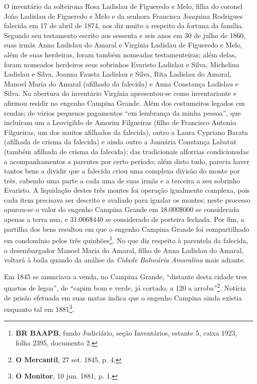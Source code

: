 O inventário da solteirona Rosa Ladislau de Figueredo e Melo, filha do coronel João Ladislau de Figueredo e Melo e da senhora Francisca Joaquina Rodrigues falecida em 17 de abril de 1874, nos diz muito a respeito da fortuna da família. Segundo seu testamento escrito aos sessenta e seis anos em 30 de julho de 1860, suas irmãs Anna Ladislau do Amaral e Virgínia Ladislau de Figueredo e Melo, além de suas herdeiras, foram também nomeadas testamenteiras; além delas, foram nomeados herdeiros seus sobrinhos Evaristo Ladislau e Silva, Michelina Ladislau e Silva, Joanna Fausta Ladislau e Silva, Rita Ladislau do Amaral, Manoel Maria do Amaral (afilhado da falecida) e Anna Constança Ladislau e Silva. Na abertura do inventário Virgínia apresentou-se como inventariante e afirmou residir no engenho Campina Grande. Além dos costumeiros legados em rendas; de vários pequenos pagamentos ``em lembrança da minha pessoa'', que incluíram um a Leovigildo de Amorim Filgueiras (filho de Francisco Antonio Filgueiras, um dos muitos afilhados da falecida), outro a Laura Cypriano Barata (afilhada de crisma da falecida) e ainda outro a Januária Constança Labatut (também afilhada de crisma da falecida); das tradicionais alforrias condicionadas a acompanhamentos a parentes por certo período; além disto tudo, parecia haver tantos bens a dividir que a falecida criou uma complexa divisão do monte por três, cabendo uma parte a cada uma de suas irmãs e a terceira a seu sobrinho Evaristo. A liquidação destes três montes foi operação igualmente complexa, pois cada item precisava ser descrito e avaliado para igualar os montes; neste processo apurou-se o valor do engenho Campina Grande em 18:000\$000 se considerada apenas a terra nua, e 31:006\$440 se considerado de porteira fechada. Por fim, a partilha dos bens resultou em que o engenho Campina Grande foi compartilhado em condomĩnio pelos três quinhões\footnote{\textbf{BR BAAPB}, fundo Judiciário, seção Inventários, estante 5, caixa 1923, folha 2395, documento 2.}. No que diz respeito à parentela da falecida, o desembargador Manoel Maria do Amaral, filho de Anna Ladislau do Amaral, voltará à baila quando da análise da \textit{Cidade Balneária Amaralina} mais adiante.

Em 1845 se anunciava a venda, no Campina Grande, ``distante desta cidade tres quartos de legoa'', de ``capim bom e verde, já cortado, a 120 a arroba''\footnote{\textbf{O Mercantil}, 27 set. 1845, p. 4.}. Notícia de prisão efetuada em suas matas indica que o engenho Campina ainda existia enquanto tal em 1881\footnote{\textbf{O Monitor}, 10 jun. 1881, p. 1.}.

